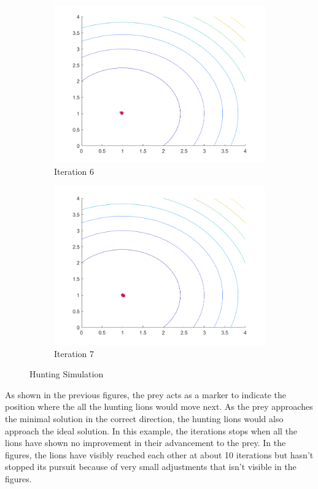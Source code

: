 \begin{figure}
\begin{subfigure}[b]{0.4\textwidth}
    \includegraphics[width=\textwidth]{img/pa/hunting_ex/hunt-iter-6}
    \caption{Iteration 6}
    \label{fig:hnt-iter-6}
  \end{subfigure}
  \begin{subfigure}[b]{0.4\textwidth}
    \includegraphics[width=\textwidth]{img/pa/hunting_ex/hunt-iter-7}
    \caption{Iteration 7}
    \label{fig:hnt-iter-7}
  \end{subfigure}
  \caption{Hunting Simulation}
\end{figure}

As shown in the previous figures, the prey acts as a marker to indicate the position where the all the hunting lions would move next. As the prey approaches the minimal solution in the correct direction, the hunting lions would also approach the ideal solution. In this example, the iterations stops when all the lions have shown no improvement in their advancement to the prey. In the figures, the lions have visibly reached each other at about 10 iterations but hasn't stopped its pursuit because of very small adjustments that isn't visible in the figures.

